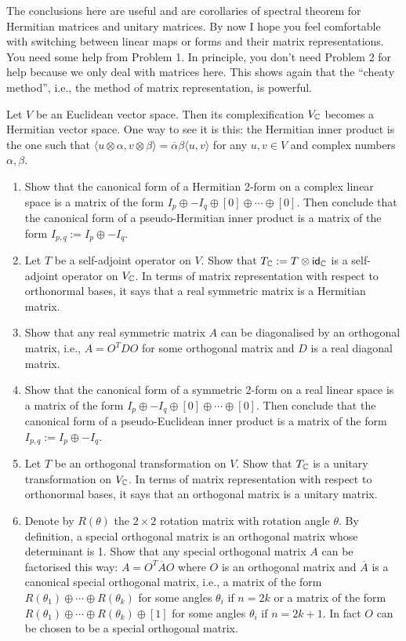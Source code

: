 The conclusions here are useful and are corollaries of spectral theorem for Hermitian matrices and unitary matrices. By now I hope you feel comfortable with switching between linear maps or forms and their matrix representations. You need some help from Problem 1. In principle, you don't need Problem 2 for help because we only deal with matrices here. This shows again that the ``cheaty method'', i.e., the method of matrix representation, is powerful.
\begin{problem}
Let $V$ be an Euclidean vector space. Then its complexification $V_{\operatorname{\mathbb{C}}}$ becomes a Hermitian vector space. One way to see it is this: the Hermitian inner product is the one such that $\langle u \otimes \alpha, v \otimes \beta \rangle = \overline{\alpha} \beta \langle u, v \rangle$ for any $u, v \in V$ and complex numbers $\alpha, \beta$.
\begin{enumerate}
	\item Show that the canonical form of a Hermitian 2-form on a complex linear space is a matrix of the form $I_p \oplus -I_q \oplus [0] \oplus \cdots \oplus [0]$. Then conclude that the canonical form of a pseudo-Hermitian inner product is a matrix of the form $I_{p, q} := I_p \oplus -I_q$.
	\item Let $T$ be a self-adjoint operator on $V$. Show that $T_{\operatorname{\mathbb{C}}} := T \otimes \operatorname{\text{\normalfont\sffamily id}}_{\operatorname{\mathbb{C}}}$ is a self-adjoint operator on $V_{\operatorname{\mathbb{C}}}$. In terms of matrix representation with respect to orthonormal bases, it says that a real symmetric matrix is a Hermitian matrix.
	\item Show that any real symmetric matrix $A$ can be diagonalised by an orthogonal matrix, i.e., $A = O^T D O$ for some orthogonal matrix and $D$ is a real diagonal matrix.
	\item Show that the canonical form of a symmetric 2-form on a real linear space is a matrix of the form $I_p \oplus -I_q \oplus [0] \oplus \cdots \oplus [0]$. Then conclude that the canonical form of a pseudo-Euclidean inner product is a matrix of the form $I_{p, q} := I_p \oplus -I_q$.
	\item Let $T$ be an orthogonal transformation on $V$. Show that $T_{\operatorname{\mathbb{C}}}$ is a unitary transformation on $V_{\operatorname{\mathbb{C}}}$. In terms of matrix representation with respect to orthonormal bases, it says that an orthogonal matrix is a unitary matrix.
	\item Denote by $R(\theta)$ the $2 \times 2$ rotation matrix with rotation angle $\theta$. By definition, a special orthogonal matrix is an orthogonal matrix whose determinant is 1. Show that any special orthogonal matrix $A$ can be factorised this way: $A = O^T \overline{A} O$ where $O$ is an orthogonal matrix and $\overline{A}$ is a canonical special orthogonal matrix, i.e., a matrix of the form $R(\theta_1) \oplus \cdots \oplus R(\theta_k)$ for some angles $\theta_i$ if $n = 2k$ or a matrix of the form $R(\theta_1) \oplus \cdots \oplus R(\theta_k) \oplus [1]$ for some angles $\theta_i$ if $n = 2k + 1$. In fact $O$ can be chosen to be a special orthogonal matrix.

\end{enumerate}
\end{problem}
